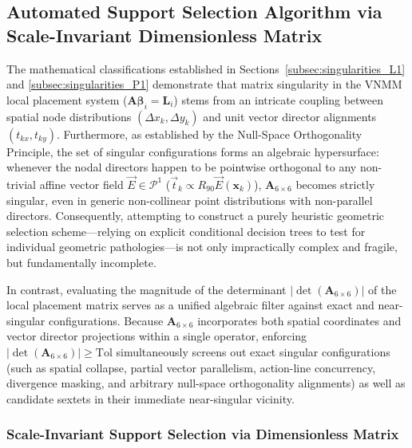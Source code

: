 \documentclass[preprint,12pt]{elsarticle}
\begin{document}
\subsection{Automated Support Selection Algorithm via Scale-Invariant Dimensionless Matrix}
\label{sec:support_selection_algorithm}

The mathematical classifications established in Sections~\ref{subsec:singularities_L1} and \ref{subsec:singularities_P1} demonstrate that matrix singularity in the VNMM local placement system ($\mathbf{A} \boldsymbol{\beta}_i = \mathbf{L}_i$) stems from an intricate coupling between spatial node distributions $(\Delta x_k, \Delta y_k)$ and unit vector director alignments $(t_{kx}, t_{ky})$. Furthermore, as established by the Null-Space Orthogonality Principle, the set of singular configurations forms an algebraic hypersurface: whenever the nodal directors happen to be pointwise orthogonal to any non-trivial affine vector field $\vec{E} \in \mathcal{P}^1$ ($\vec{t}_k \propto R_{90} \vec{E}(\mathbf{x}_k)$), $\mathbf{A}_{6 \times 6}$ becomes strictly singular, even in generic non-collinear point distributions with non-parallel directors. Consequently, attempting to construct a purely heuristic geometric selection scheme---relying on explicit conditional decision trees to test for individual geometric pathologies---is not only impractically complex and fragile, but fundamentally incomplete.

In contrast, evaluating the magnitude of the determinant $|\det(\mathbf{A}_{6\times6})|$ of the local placement matrix serves as a unified algebraic filter against exact and near-singular configurations. Because $\mathbf{A}_{6\times6}$ incorporates both spatial coordinates and vector director projections within a single operator, enforcing $|\det(\mathbf{A}_{6\times6})| \ge \mathrm{Tol}$ simultaneously screens out exact singular configurations (such as spatial collapse, partial vector parallelism, action-line concurrency, divergence masking, and arbitrary null-space orthogonality alignments) as well as candidate sextets in their immediate near-singular vicinity.

\subsubsection{Scale-Invariant Support Selection via Dimensionless Matrix}
\label{subsec:scale_invariant_criterion}
\end{document}
